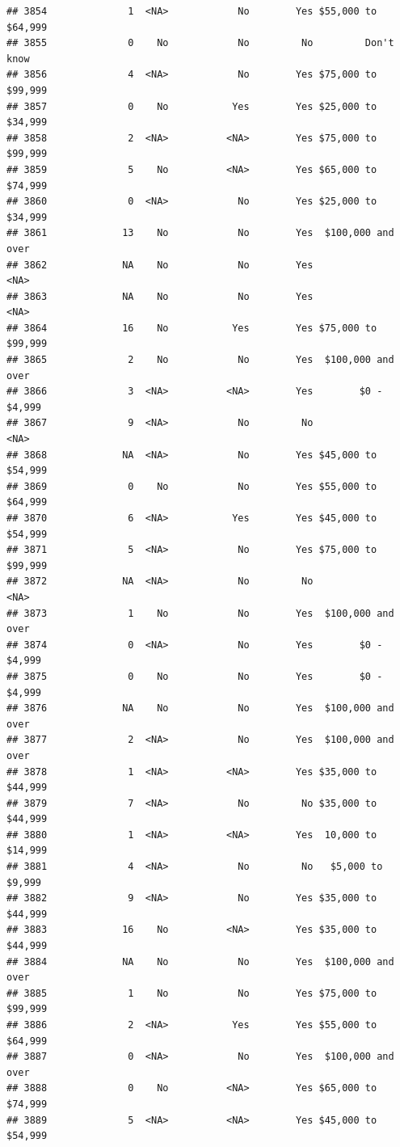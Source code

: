 \documentclass[man]{apa6}
\begin{document}
\begin{verbatim}
## 3854              1  <NA>            No        Yes $55,000 to $64,999
## 3855              0    No            No         No         Don't know
## 3856              4  <NA>            No        Yes $75,000 to $99,999
## 3857              0    No           Yes        Yes $25,000 to $34,999
## 3858              2  <NA>          <NA>        Yes $75,000 to $99,999
## 3859              5    No          <NA>        Yes $65,000 to $74,999
## 3860              0  <NA>            No        Yes $25,000 to $34,999
## 3861             13    No            No        Yes  $100,000 and over
## 3862             NA    No            No        Yes               <NA>
## 3863             NA    No            No        Yes               <NA>
## 3864             16    No           Yes        Yes $75,000 to $99,999
## 3865              2    No            No        Yes  $100,000 and over
## 3866              3  <NA>          <NA>        Yes        $0 - $4,999
## 3867              9  <NA>            No         No               <NA>
## 3868             NA  <NA>            No        Yes $45,000 to $54,999
## 3869              0    No            No        Yes $55,000 to $64,999
## 3870              6  <NA>           Yes        Yes $45,000 to $54,999
## 3871              5  <NA>            No        Yes $75,000 to $99,999
## 3872             NA  <NA>            No         No               <NA>
## 3873              1    No            No        Yes  $100,000 and over
## 3874              0  <NA>            No        Yes        $0 - $4,999
## 3875              0    No            No        Yes        $0 - $4,999
## 3876             NA    No            No        Yes  $100,000 and over
## 3877              2  <NA>            No        Yes  $100,000 and over
## 3878              1  <NA>          <NA>        Yes $35,000 to $44,999
## 3879              7  <NA>            No         No $35,000 to $44,999
## 3880              1  <NA>          <NA>        Yes  10,000 to $14,999
## 3881              4  <NA>            No         No   $5,000 to $9,999
## 3882              9  <NA>            No        Yes $35,000 to $44,999
## 3883             16    No          <NA>        Yes $35,000 to $44,999
## 3884             NA    No            No        Yes  $100,000 and over
## 3885              1    No            No        Yes $75,000 to $99,999
## 3886              2  <NA>           Yes        Yes $55,000 to $64,999
## 3887              0  <NA>            No        Yes  $100,000 and over
## 3888              0    No          <NA>        Yes $65,000 to $74,999
## 3889              5  <NA>          <NA>        Yes $45,000 to $54,999

\end{verbatim}
\end{document}
